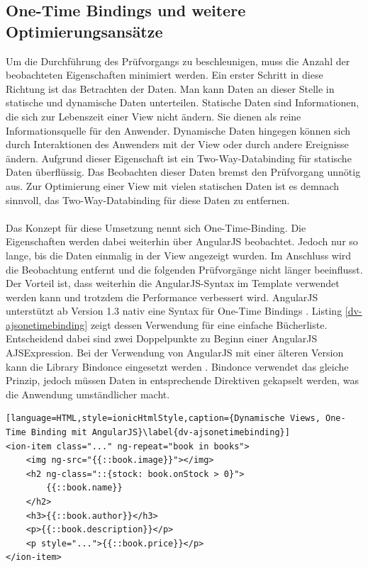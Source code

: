 \subsection{One-Time Bindings und weitere Optimierungsansätze}
\label{dyn-views-onetimebinding}
Um die Durchführung des Prüfvorgangs zu beschleunigen, muss die Anzahl der beobachteten Eigenschaften minimiert werden. Ein erster Schritt in diese Richtung ist das Betrachten der Daten. Man kann Daten an dieser Stelle in statische und dynamische Daten unterteilen. Statische Daten sind Informationen, die sich zur Lebenszeit einer View nicht ändern. Sie dienen als reine Informationsquelle für den Anwender. Dynamische Daten hingegen können sich durch Interaktionen des Anwenders mit der View oder durch andere Ereignisse ändern. Aufgrund dieser Eigenschaft ist ein Two-Way-Databinding für statische Daten überflüssig. Das Beobachten dieser Daten bremst den Prüfvorgang unnötig aus. Zur Optimierung einer View mit vielen statischen Daten ist es demnach sinnvoll, das Two-Way-Databinding für diese Daten zu entfernen. 
\\\\
Das Konzept für diese Umsetzung nennt sich One-Time-Binding. Die Eigenschaften werden dabei weiterhin über AngularJS beobachtet. Jedoch nur so lange, bis die Daten einmalig in der View angezeigt wurden. Im Anschluss wird die Beobachtung entfernt und die folgenden Prüfvorgänge nicht länger beeinflusst. Der Vorteil ist, dass weiterhin die AngularJS-Syntax im \gls{Template} verwendet werden kann und trotzdem die Performance verbessert wird. AngularJS unterstützt ab Version 1.3 nativ eine Syntax für One-Time Bindings \cite{AJSOneTimeBinding}. Listing \ref{dv-ajsonetimebinding} zeigt dessen Verwendung für eine einfache Bücherliste. Entscheidend dabei sind zwei Doppelpunkte zu Beginn einer AngularJS \gls{AJSExpression}. Bei der Verwendung von AngularJS mit einer älteren Version kann die Library Bindonce eingesetzt werden \cite{Bindonce}. Bindonce verwendet das gleiche Prinzip, jedoch müssen Daten in entsprechende Direktiven gekapselt werden, was die Anwendung umständlicher macht. 
\begin{lstlisting}[language=HTML,style=ionicHtmlStyle,caption={Dynamische Views, One-Time Binding mit AngularJS}\label{dv-ajsonetimebinding}]
<ion-item class="..." ng-repeat="book in books">
	<img ng-src="{{::book.image}}"></img>
	<h2 ng-class="::{stock: book.onStock > 0}">
		{{::book.name}}
	</h2>
	<h3>{{::book.author}}</h3>
	<p>{{::book.description}}</p>
	<p style="...">{{::book.price}}</p>
</ion-item>
\end{lstlisting}
